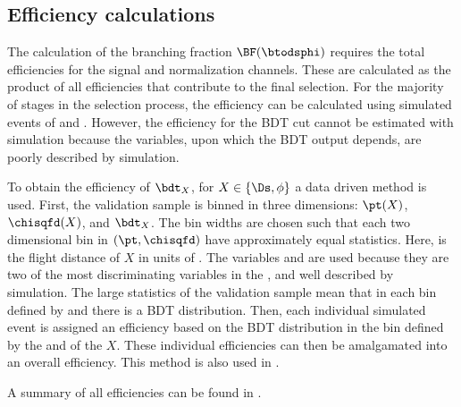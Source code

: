 \subsection{Efficiency calculations}
The calculation of the branching fraction $\BF(\btodsphi)$ requires the total efficiencies for the
signal and normalization channels.
These are calculated as the product of all efficiencies that contribute to the final selection.
For the majority of stages in the selection process, the efficiency can be calculated using
simulated events of \btodsphi and \btodsd.
However, the efficiency for the BDT cut cannot be estimated with simulation because the \pid
variables, upon which the BDT output depends, are poorly described by simulation.



To obtain the efficiency of $\bdt_{X}$, for $X\in\{\Ds,\phi\}$ a data driven method is used.
First, the validation sample is
binned in three dimensions: $\pt(X)$, $\chisqfd(X)$, and $\bdt_{X}$.
The bin widths are chosen such that each two dimensional bin in $(\pt,\chisqfd)$ have approximately
equal statistics.
Here, \chisqfd is the flight distance of $X$ in units of \chisq.
The variables \pt and \chisqfd are used because they are two of the most discriminating variables
in the \bdt, and well described by simulation.
The large statistics of the validation sample mean that in each bin defined by \pt and \chisqfd
there is a BDT distribution.
Then, each individual simulated event is assigned an efficiency based on the BDT distribution in
the bin defined by the \pt and \chisqfd of the $X$.
These individual efficiencies can then be amalgamated into an overall efficiency.
This method is also used in .

A summary of all efficiencies can be found in .


